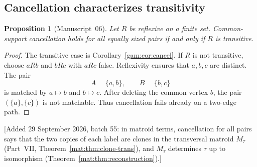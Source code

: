 \documentclass[11pt]{article}
\numberwithin{equation}{section}
\newtheorem{proposition}[theorem]{Proposition}
\theoremstyle{definition}
\begin{document}
\subsection{Cancellation characterizes transitivity}
\begin{proposition}[Manuscript~06]\label{gam:prop:canceliff}
Let $R$ be reflexive on a finite set. Common-support cancellation holds for
all equally sized pairs if and only if $R$ is transitive.
\end{proposition}
\begin{proof}
The transitive case is Corollary~\ref{gam:cor:cancel}. If $R$ is not
transitive, choose $aRb$ and $bRc$ with $aRc$ false. Reflexivity ensures
that $a,b,c$ are distinct. The pair
\[
 A=\{a,b\},\qquad B=\{b,c\}
\]
is matched by $a\mapsto b$ and $b\mapsto c$. After deleting the common
vertex $b$, the pair $(\{a\},\{c\})$ is not matchable. Thus cancellation
fails already on a two-edge path.
\end{proof}
[Added 29 September 2026, batch 55: in matroid terms, cancellation for
all pairs says that the two copies of each label are clones in the
transversal matroid $M_\tau$ (Part~VII, Theorem~\ref{mat:thm:clone-trans}),
and $M_\tau$ determines $\tau$ up to isomorphism
(Theorem~\ref{mat:thm:reconstruction}).]
\end{document}

